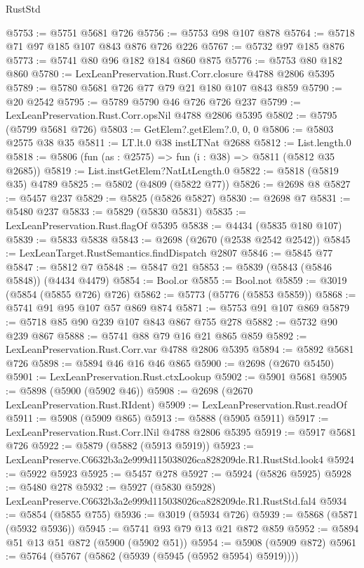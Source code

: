 \begin{lexlean}{RustStd}
\begin{coremodule}
@5753 := @5751 @5681 @726
@5756 := @5753 @98 @107 @878
@5764 := @5718 @71 @97 @185 @107 @843 @876 @726 @226
@5767 := @5732 @97 @185 @876
@5773 := @5741 @80 @96 @182 @184 @860 @875
@5776 := @5753 @80 @182 @860
@5780 := LexLeanPreservation.Rust.Corr.closure @4788 @2806 @5395
@5789 := @5780 @5681 @726 @77 @79 @21 @180 @107 @843 @859
@5790 := @20 @2542
@5795 := @5789 @5790 @46 @726 @726 @237
@5799 := LexLeanPreservation.Rust.Corr.opsNil @4788 @2806 @5395
@5802 := @5795 (@5799 @5681 @726)
@5803 := GetElem?.getElem?.{0, 0, 0}
@5806 := @5803 @2575 @38 @35
@5811 := LT.lt.{0} @38 instLTNat @2688
@5812 := List.length.{0}
@5818 := @5806 (fun (as : @2575) => fun (i : @38) => @5811 (@5812 @35 @2685))
@5819 := List.instGetElem?NatLtLength.{0}
@5822 := @5818 (@5819 @35) @4789
@5825 := @5802 (@4809 (@5822 @77))
@5826 := @2698 @8
@5827 := @5457 @237
@5829 := @5825 (@5826 @5827)
@5830 := @2698 @7
@5831 := @5480 @237
@5833 := @5829 (@5830 @5831)
@5835 := LexLeanPreservation.Rust.flagOf @5395
@5838 := @4434 (@5835 @180 @107)
@5839 := @5833 @5838
@5843 := @2698 (@2670 (@2538 @2542 @2542))
@5845 := LexLeanTarget.RustSemantics.findDispatch @2807
@5846 := @5845 @77
@5847 := @5812 @7
@5848 := @5847 @21
@5853 := @5839 (@5843 (@5846 @5848)) (@4434 @4479)
@5854 := Bool.or
@5855 := Bool.not
@5859 := @3019 (@5854 (@5855 @726) @726)
@5862 := @5773 (@5776 (@5853 @5859))
@5868 := @5741 @91 @95 @107 @57 @869 @874
@5871 := @5753 @91 @107 @869
@5879 := @5718 @85 @90 @239 @107 @843 @867 @755 @278
@5882 := @5732 @90 @239 @867
@5888 := @5741 @88 @79 @16 @21 @865 @859
@5892 := LexLeanPreservation.Rust.Corr.var @4788 @2806 @5395
@5894 := @5892 @5681 @726
@5898 := @5894 @46 @16 @46 @865
@5900 := @2698 (@2670 @5450)
@5901 := LexLeanPreservation.Rust.ctxLookup
@5902 := @5901 @5681
@5905 := @5898 (@5900 (@5902 @46))
@5908 := @2698 (@2670 LexLeanPreservation.Rust.RIdent)
@5909 := LexLeanPreservation.Rust.readOf
@5911 := @5908 (@5909 @865)
@5913 := @5888 (@5905 @5911)
@5917 := LexLeanPreservation.Rust.Corr.lNil @4788 @2806 @5395
@5919 := @5917 @5681 @726
@5922 := @5879 (@5882 (@5913 @5919))
@5923 := LexLeanPreserve.C6632b3a2e999d115038026ca828209de.R1.RustStd.look4
@5924 := @5922 @5923
@5925 := @5457 @278
@5927 := @5924 (@5826 @5925)
@5928 := @5480 @278
@5932 := @5927 (@5830 @5928) LexLeanPreserve.C6632b3a2e999d115038026ca828209de.R1.RustStd.fal4
@5934 := @5854 (@5855 @755)
@5936 := @3019 (@5934 @726)
@5939 := @5868 (@5871 (@5932 @5936))
@5945 := @5741 @93 @79 @13 @21 @872 @859
@5952 := @5894 @51 @13 @51 @872 (@5900 (@5902 @51))
@5954 := @5908 (@5909 @872)
@5961 := @5764 (@5767 (@5862 (@5939 (@5945 (@5952 @5954) @5919))))

\end{coremodule}
\end{lexlean}
